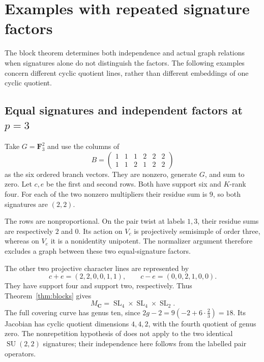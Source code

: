 \documentclass[11pt]{article}
\theoremstyle{definition}
\newcommand{\C}{\mathbf C}
\newcommand{\F}{\mathbf F}
\newcommand{\SL}{\operatorname{SL}}
\begin{document}
\section{Examples with repeated signature factors}\label{sec:monodromyexamples}
The block theorem determines both independence and actual graph relations
when signatures alone do not distinguish the factors. The following
examples concern different cyclic quotient lines, rather than different
embeddings of one cyclic quotient.

\subsection{Equal signatures and independent factors at $p=3$}
Take $G=\F_3^2$ and use the columns of
\[
 B=\begin{pmatrix}
 1&1&1&2&2&2\\
 1&1&2&1&2&2
 \end{pmatrix}
\]
as the six ordered branch vectors. They are nonzero, generate $G$, and
sum to zero. Let $c,e$ be the first and second rows. Both have support
six and $K$-rank four. For each of the two nonzero multipliers their
residue sum is $9$, so both signatures are $(2,2)$.

The rows are nonproportional. On the pair twist at labels $1,3$, their
residue sums are respectively $2$ and $0$. Its action on $V_c$ is
projectively semisimple of order three, whereas on $V_e$ it is a
nonidentity unipotent. The normalizer argument therefore excludes a
graph between these two equal-signature factors.

The other two projective character lines are represented by
\[
 c+e=(2,2,0,0,1,1),\qquad c-e=(0,0,2,1,0,0).
\]
They have support four and support two, respectively. Thus
Theorem~\ref{thm:blocks} gives
\[
                       M_\C=\SL_4\times\SL_4\times\SL_2.
\]
The full covering curve has genus ten, since
$2g-2=9(-2+6\cdot\frac23)=18$. Its Jacobian has cyclic quotient
dimensions $4,4,2$, with the fourth quotient of genus zero. The
nonrepetition hypothesis of \cite[Theorem~1.7]{ST} does not apply to the
two identical $\operatorname{SU}(2,2)$ signatures; their independence
here follows from the labelled pair operators.
\end{document}
